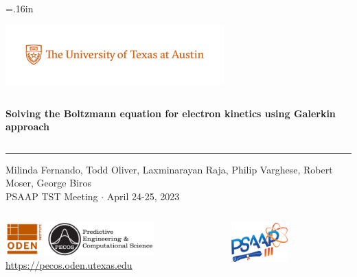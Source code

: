 \documentclass[mathserif, aspectratio=169]{beamer}
\begin{document}


\hoffset=.16in

\begin{frame}[plain,t]{}
\makeatletter
\includegraphics[height=0.9in,trim=50 40 40 0, clip]{PMSc_159_university_formal_horizontal.pdf} \newline
\begin{columns}[T,onlytextwidth]
{\bf \color{burntorange} \selectfont 
Solving the Boltzmann equation for electron kinetics using Galerkin approach
}
\end{columns}
\vspace*{.15cm}
\rule{.8\textwidth}{0.6pt} \newline

\vspace*{0.05cm}
{\selectfont
  { \scriptsize
    Milinda Fernando, Todd Oliver, Laxminarayan Raja, Philip Varghese, Robert Moser, George Biros  \\
  }
  {\color{burntorange} \tiny
    PSAAP TST Meeting $\cdot$ April 24-25, 2023
  }
}

\vspace*{1cm}
\begin{columns}
\begin{column}{0.8\linewidth}
\includegraphics[height=0.5in]{oden_pecos_2020_wordmark.png}\\
{\scriptsize \url{https://pecos.oden.utexas.edu}}
\end{column}

\begin{column}{0.2\linewidth}
\includegraphics[height=0.6in]{psaap3-logo.png}
\end{column}
\end{columns}

\end{frame}
\hoffset=0in
\end{document}
